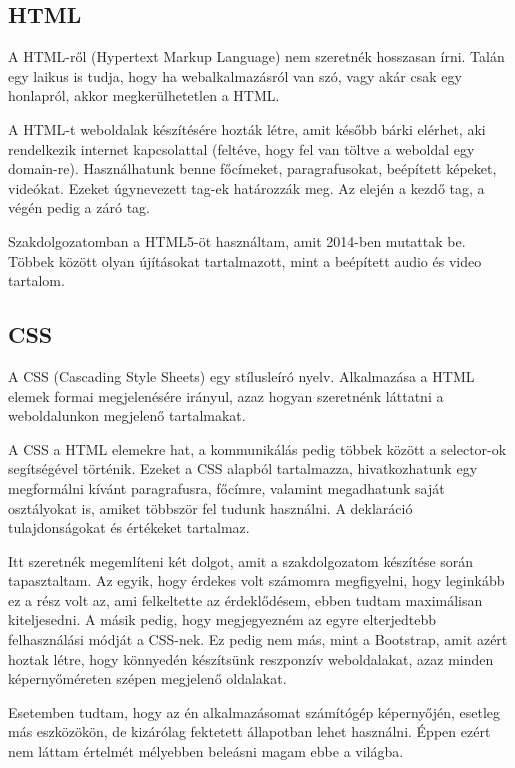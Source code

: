 \subsection{HTML}
A HTML-ről (Hypertext Markup Language) nem szeretnék hosszasan írni. Talán egy laikus is tudja, hogy ha webalkalmazásról van szó, vagy akár csak egy honlapról, akkor megkerülhetetlen a HTML.

A HTML-t weboldalak készítésére hozták létre, amit később bárki elérhet, aki rendelkezik internet kapcsolattal (feltéve, hogy fel van töltve a weboldal egy domain-re). Használhatunk benne főcímeket, paragrafusokat, beépített képeket, videókat. Ezeket úgynevezett tag-ek határozzák meg. Az elején a kezdő tag, a végén pedig a záró tag.

Szakdolgozatomban a HTML5-öt használtam, amit 2014-ben mutattak be. Többek között olyan újításokat tartalmazott, mint a beépített audio és video tartalom.
\cite{web}

\subsection{CSS}

A CSS (Cascading Style Sheets) egy stílusleíró nyelv. Alkalmazása a HTML elemek formai megjelenésére irányul, azaz hogyan szeretnénk láttatni a weboldalunkon megjelenő tartalmakat.

A CSS a HTML elemekre hat, a kommunikálás pedig többek között a selector-ok segítségével történik. Ezeket a CSS alapból tartalmazza, hivatkozhatunk egy megformálni kívánt paragrafusra, főcímre, valamint megadhatunk saját osztályokat is, amiket többször fel tudunk használni. A deklaráció tulajdonságokat és értékeket tartalmaz.

Itt szeretnék megemlíteni két dolgot, amit a szakdolgozatom készítése során tapasztaltam. Az egyik, hogy érdekes volt számomra megfigyelni, hogy leginkább ez a rész volt az, ami felkeltette az érdeklődésem, ebben tudtam maximálisan kiteljesedni. A másik pedig, hogy megjegyezném az egyre elterjedtebb felhasználási módját a CSS-nek. Ez pedig nem más, mint a Bootstrap, amit azért hoztak létre, hogy könnyedén készítsünk reszponzív weboldalakat, azaz minden képernyőméreten szépen megjelenő oldalakat.

Esetemben tudtam, hogy az én alkalmazásomat számítógép képernyőjén, esetleg más eszközökön, de kizárólag fektetett állapotban lehet használni. Éppen ezért nem láttam értelmét mélyebben beleásni magam ebbe a világba.
\cite{web}

